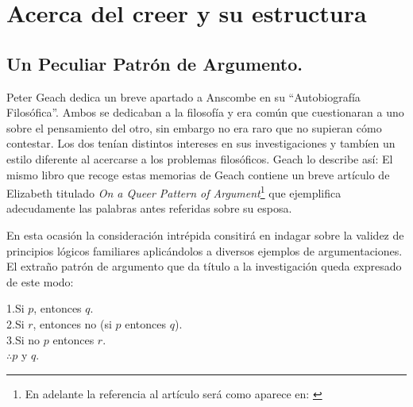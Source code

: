 \section{Acerca del creer y su estructura}

\subsection{Un Peculiar Patrón de Argumento.}
Peter Geach dedica un breve apartado a Anscombe en su ``Autobiografía
Filosófica''. Ambos se dedicaban a la filosofía y era común que cuestionaran a
uno sobre el pensamiento del otro, sin embargo no era raro que no supieran cómo
contestar. Los dos tenían distintos intereses en sus investigaciones y tambíen
un estilo diferente al acercarse a los problemas filosóficos. Geach lo describe
así:  El mismo libro que recoge
estas memorias de Geach contiene un breve artículo de Elizabeth titulado
\emph{On a Queer Pattern of Argument}\footnote{\cite{anscombe1991aqp} En
  adelante la referencia al artículo será como aparece en:
  \cite{anscombe2015logic:qpa}} que ejemplifica adecudamente las palabras antes
referidas sobre su esposa.

En esta ocasión la consideración intrépida consitirá en indagar sobre la validez
de principios lógicos familiares aplicándolos a diversos ejemplos de
argumentaciones. El extraño patrón de argumento que da título a la investigación
queda expresado de este modo:
  \begin{adjustwidth}{1.2cm}{}
    1.\hspace{.459cm}Si $p$, entonces $q$.\\
    2.\hspace{.459cm}Si $r$, entonces no (si $p$ entonces $q$).\\
    3.\hspace{.459cm}Si no $p$ entonces $r$.\\
    $\therefore$\hspace{.459cm}$p$ y $q$.
  \end{adjustwidth}

